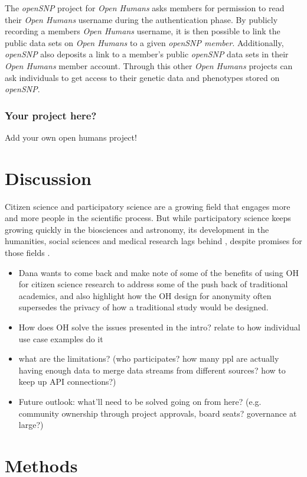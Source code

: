 \documentclass[a4paper,num-refs]{oup-contemporary}
\begin{document}
The \textit{openSNP} project for \textit{Open Humans} asks members for permission to read their \textit{Open Humans} username during the authentication phase. By publicly recording a members \textit{Open Humans} username, it is then possible to link the public data sets on \textit{Open Humans} to a given \textit{openSNP member}. Additionally, \textit{openSNP} also deposits a link to a member's public \textit{openSNP} data sets in their \textit{Open Humans} member account. Through this other \textit{Open Humans} projects can ask individuals to get access to their genetic data and phenotypes stored on \textit{openSNP}.


\subsubsection{Your project here?}
Add your own open humans project!

\section{Discussion}
Citizen science and participatory science are a growing field that engages more and more people in the scientific process. But while participatory science keeps growing quickly in the biosciences and astronomy, its development in the humanities, social sciences and medical research lags behind \cite{Kullenberg2016}, despite promises for those fields \cite{Rowbotham2017}. 

\begin{itemize}
    \item Dana wants to come back and make note of some of the benefits of using OH for citizen science research to address some of the push back of traditional academics, and also highlight how the OH design for anonymity often supersedes the privacy of how a traditional study would be designed.
    \item How does OH solve the issues presented in the intro? relate to how individual use case examples do it
    \item what are the limitations? (who participates? how many ppl are actually having enough data to merge data streams from different sources? how to keep up API connections?) 
    \item Future outlook: what'll need to be solved going on from here? (e.g. community ownership through project approvals, board seats? governance at large?) 
\end{itemize}


\section{Methods}
\end{document}
